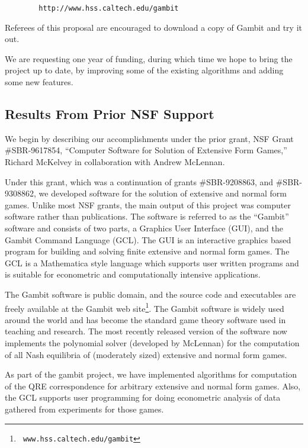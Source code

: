 \documentclass[12pt]{article}
\begin{document}
\bigskip
\noindent
\verb+        http://www.hss.caltech.edu/gambit+

\bigskip
\noindent
Referees of this proposal are encouraged to download a copy of Gambit
and try it out.  

We are requesting one year of funding, during which time we hope to
bring the project up to date, by improving some of the existing
algorithms and adding some new features.

\subsection{Results From Prior NSF Support} 

We begin by describing our accomplishments under the prior grant, NSF
Grant \#SBR-9617854, ``Computer Software for Solution of Extensive
Form Games,'' Richard McKelvey in collaboration with Andrew McLennan.

\bigskip
Under this grant, which was a continuation of grants \#SBR-9208863,
and \#SBR-9308862, we developed software for the solution of extensive
and normal form games. Unlike most NSF grants, the main output of this
project was computer software rather than publications. The software
is referred to as the ``Gambit'' software and consists of two parts, a
Graphics User Interface (GUI), and the Gambit Command Language
(GCL). The GUI is an interactive graphics based program for building
and solving finite extensive and normal form games. The GCL is a
Mathematica style language which supports user written programs and is
suitable for econometric and computationally intensive applications.

The Gambit software is public domain, and the source code and executables
are freely available at the Gambit web site\footnote{{\tt
www.hss.caltech.edu/gambit}}. The Gambit software is widely
used around the world and has become the standard game theory software used
in teaching and research. The most recently released version of the software
now implements the polynomial solver (developed by McLennan) for the
computation of all Nash equilibria of (moderately sized) extensive and
normal form games.

As part of the gambit project, we have implemented algorithms for
computation of the QRE correspondence for arbitrary extensive and normal
form games. Also, the GCL supports user programming for doing econometric
analysis of data gathered from experiments for those games. 
\end{document}
